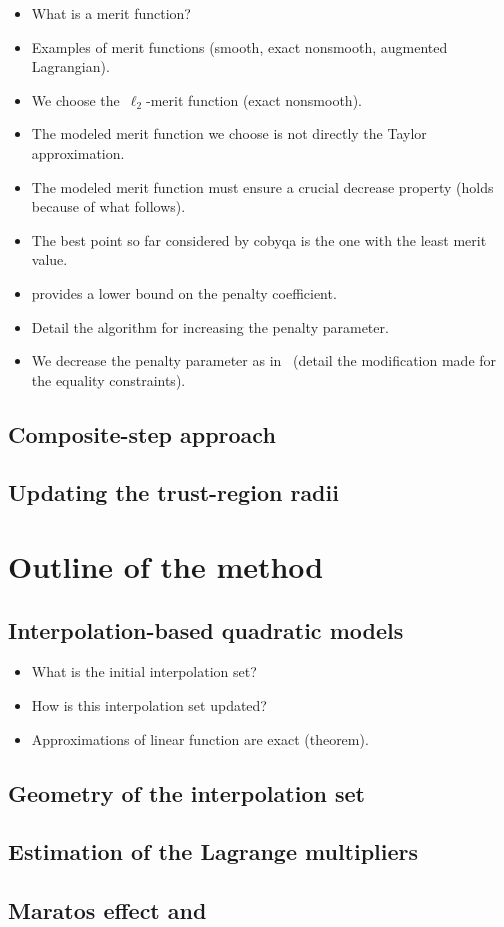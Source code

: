 \begin{itemize}
    \item What is a merit function?
    \item Examples of merit functions (smooth, exact nonsmooth, augmented Lagrangian).
    \item We choose the~$\ell_2$-merit function (exact nonsmooth).
    \item The modeled merit function we choose is not directly the Taylor approximation.
    \item The modeled merit function must ensure a crucial decrease property (holds because of what follows).
    \item The best point so far considered by \gls{cobyqa} is the one with the least merit value.
    \item \Cite[thm.~14.5.1]{Conn_Gould_Toint_2000} provides a lower bound on the penalty coefficient.
    \item Detail the algorithm for increasing the penalty parameter.
    \item We decrease the penalty parameter as in~\cite{Powell_1994} (detail the modification made for the equality constraints).
\end{itemize}

\subsection{Composite-step approach}

\subsection{Updating the trust-region radii}

\section{Outline of the  method}

\subsection{Interpolation-based quadratic models}
\label{subsec:cobyqa-models}

\begin{itemize}
    \item What is the initial interpolation set?
    \item How is this interpolation set updated?
    \item Approximations of linear function are exact (theorem).
\end{itemize}

\subsection{Geometry of the interpolation set}

\subsection{Estimation of the Lagrange multipliers}

\subsection{Maratos effect and }
